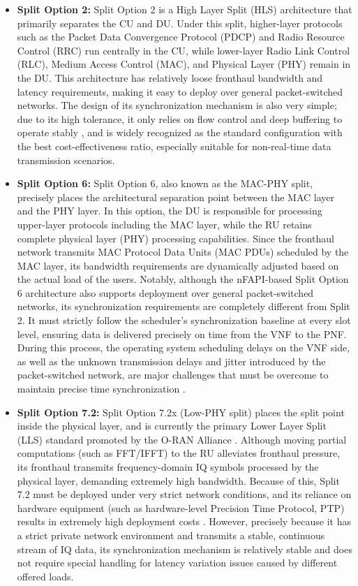 \documentclass[../my_ntust_thesis.tex]{subfiles}
\begin{document}
\begin{itemize}
\item \textbf{Split Option 2:} Split Option 2 is a High Layer Split (HLS) architecture that primarily separates the CU and DU. Under this split, higher-layer protocols such as the Packet Data Convergence Protocol (PDCP) and Radio Resource Control (RRC) run centrally in the CU, while lower-layer Radio Link Control (RLC), Medium Access Control (MAC), and Physical Layer (PHY) remain in the DU. This architecture has relatively loose fronthaul bandwidth and latency requirements, making it easy to deploy over general packet-switched networks. The design of its synchronization mechanism is also very simple; due to its high tolerance, it only relies on flow control and deep buffering to operate stably \cite{larsen2019comparison}, and is widely recognized as the standard configuration with the best cost-effectiveness ratio, especially suitable for non-real-time data transmission scenarios.

\item \textbf{Split Option 6:} Split Option 6, also known as the MAC-PHY split, precisely places the architectural separation point between the MAC layer and the PHY layer. In this option, the DU is responsible for processing upper-layer protocols including the MAC layer, while the RU retains complete physical layer (PHY) processing capabilities. Since the fronthaul network transmits MAC Protocol Data Units (MAC PDUs) scheduled by the MAC layer, its bandwidth requirements are dynamically adjusted based on the actual load of the users. Notably, although the nFAPI-based Split Option 6 architecture also supports deployment over general packet-switched networks, its synchronization requirements are completely different from Split 2. It must strictly follow the scheduler's synchronization baseline at every slot level, ensuring data is delivered precisely on time from the VNF to the PNF. During this process, the operating system scheduling delays on the VNF side, as well as the unknown transmission delays and jitter introduced by the packet-switched network, are major challenges that must be overcome to maintain precise time synchronization \cite{Foukas2021_ICC}.

\item \textbf{Split Option 7.2:} Split Option 7.2x (Low-PHY split) places the split point inside the physical layer, and is currently the primary Lower Layer Split (LLS) standard promoted by the O-RAN Alliance \cite{oran_wg4_cus}. Although moving partial computations (such as FFT/IFFT) to the RU alleviates fronthaul pressure, its fronthaul transmits frequency-domain IQ symbols processed by the physical layer, demanding extremely high bandwidth. Because of this, Split 7.2 must be deployed under very strict network conditions, and its reliance on hardware equipment (such as hardware-level Precision Time Protocol, PTP) results in extremely high deployment costs \cite{11039666}. However, precisely because it has a strict private network environment and transmits a stable, continuous stream of IQ data, its synchronization mechanism is relatively stable and does not require special handling for latency variation issues caused by different offered loads.


\end{itemize}
\end{document}
